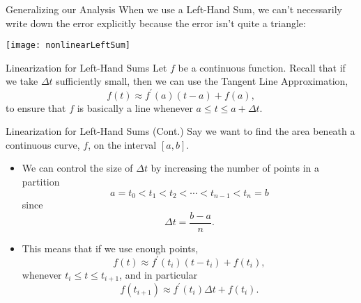 \documentclass[Lecture.tex]{subfiles}
\begin{document}
\begin{frame}{Generalizing our Analysis}
  When we use a Left-Hand Sum, we can't necessarily write down the error explicitly because the error isn't quite a triangle:
  \begin{center}
    \texttt{[image: nonlinearLeftSum]}
  \end{center}
\end{frame}

\begin{frame}{Linearization for Left-Hand Sums}
  Let $f$ be a continuous function.
  Recall that if we take $\Delta t$ sufficiently small, then we can use the Tangent Line Approximation,
  $$f(t) \approx f^\prime(a)(t - a) + f(a),$$
  to ensure that $f$ is basically a line whenever $a \leq t \leq a + \Delta t$.
\end{frame}

\begin{frame}{Linearization for Left-Hand Sums (Cont.)}
  Say we want to find the area beneath a continuous curve, $f$, on the interval $[a,b]$.
  \begin{itemize}
  \item<2->
    We can control the size of $\Delta t$ by increasing the number of points in a partition
    $$a = t_0 < t_1 < t_2 < \cdots < t_{n-1} < t_n = b$$
    since
    $$\Delta t = \frac{b - a}{n}.$$
  \item<3->
    This means that if we use enough points, 
    $$f(t) \approx f^\prime(t_i)(t - t_i) + f(t_i),$$
    whenever $t_i \leq t \leq t_{i+1}$, and in particular
    $$f(t_{i+1}) \approx f^\prime(t_i)\Delta t + f(t_i).$$
  \end{itemize}
\end{frame}
\end{document}
